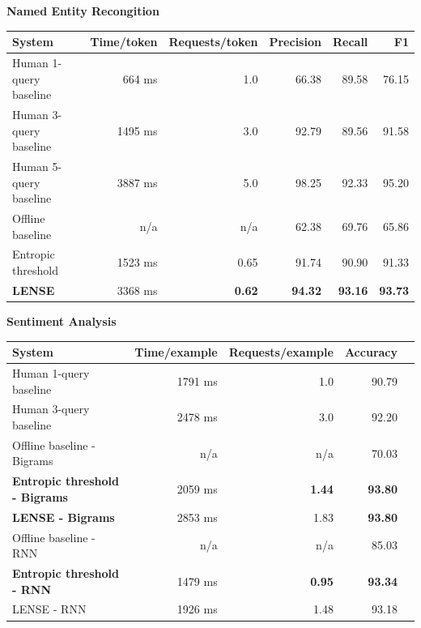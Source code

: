 \begin{table}[s]
{\bf Named Entity Recongition} \\
\begin{tabular}{l r r r r r}
    \textbf{System} & \textbf{Time/token} & \textbf{Requests/token} & \textbf{Precision} & \textbf{Recall} & \textbf{F1} \\ \hline
    Human 1-query baseline & 664 ms & 1.0 & 66.38 & 89.58 & 76.15 \\ %
    Human 3-query baseline & 1495 ms & 3.0 & 92.79 & 89.56 & 91.58 \\ %
    Human 5-query baseline & 3887 ms & 5.0 & 98.25 & 92.33 & 95.20 \\ %
    Offline baseline & n/a & n/a & 62.38 & 69.76 & 65.86 \\ %
    Entropic threshold & 1523 ms & 0.65 & 91.74 & 90.90 & 91.33 \\ %
    \textbf{LENSE} & 3368 ms & \textbf{0.62} & \textbf{94.32} & \textbf{93.16} & \textbf{93.73} \\ %
\end{tabular}

{\bf Sentiment Analysis}\\
\begin{tabular}{l  r  r  r  r}
    \textbf{System} & \textbf{Time/example} & \textbf{Requests/example} & \textbf{Accuracy} \\ \hline
    Human 1-query baseline & 1791 ms & 1.0 & 90.79 \\ %
    Human 3-query baseline & 2478 ms & 3.0 & 92.20 \\ %
    Offline baseline - Bigrams & n/a & n/a & 70.03 \\ %
    \textbf{Entropic threshold - Bigrams} & 2059 ms & \textbf{1.44} & \textbf{93.80} \\ %
    \textbf{LENSE - Bigrams} & 2853 ms & 1.83 & \textbf{93.80} \\%
    Offline baseline - RNN & n/a & n/a & 85.03 \\ %
    \textbf{Entropic threshold - RNN} & 1479 ms & \textbf{0.95} & \textbf{93.34} \\ %
    LENSE - RNN & 1926 ms & 1.48 & 93.18 \\ %
\end{tabular}


\end{table}
